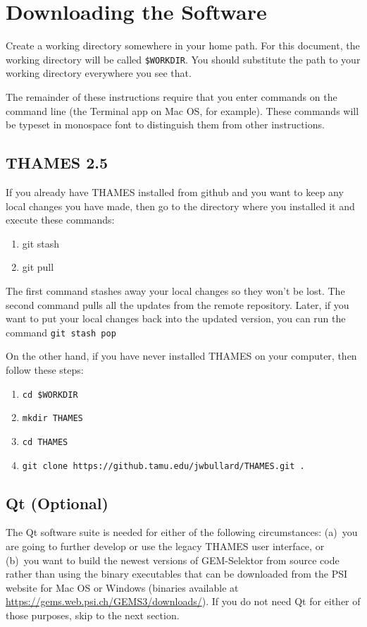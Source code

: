 \documentclass{article}
\begin{document}
\section{Downloading the Software}
Create a working directory somewhere in your home path.  For this document, the working
directory will be called \verb!$WORKDIR!.  You should substitute the path to your working
directory everywhere you see that.

The remainder of these instructions require that you enter commands on the command line
(the Terminal app on Mac OS, for example).  These commands will be typeset in monospace
font to distinguish them from other instructions.

\subsection{THAMES 2.5}
If you already have THAMES installed from github and you want to keep any local changes you
have made, then go to the directory where
you installed it and execute these commands:
\begin{enumerate}
    \item git stash
    \item git pull
\end{enumerate}
The first command stashes away your local changes so they won't be lost.  The second
command pulls all the updates from the remote repository.  Later, if you want to
put your local changes back into the updated version, you can run the command
\verb!git stash pop!

On the other hand, if you have never installed THAMES on your computer, then
follow these steps:
\begin{enumerate}
        \item \verb!cd $WORKDIR!
        \item \verb!mkdir THAMES!
        \item \verb!cd THAMES!
        \item \verb!git clone https://github.tamu.edu/jwbullard/THAMES.git .!
\end{enumerate}

\subsection{Qt (Optional)}
The Qt software suite is needed for either of the following circumstances:
(a)~you are going to further develop or use the legacy THAMES user interface, or
(b)~you want to build the newest versions of GEM-Selektor from source code rather
than using the binary executables that can be downloaded from the PSI website
for Mac OS or Windows (binaries available at
\url{https://gems.web.psi.ch/GEMS3/downloads/}).  If you do not need Qt for either
of those purposes, skip to the next section.
\end{document}

